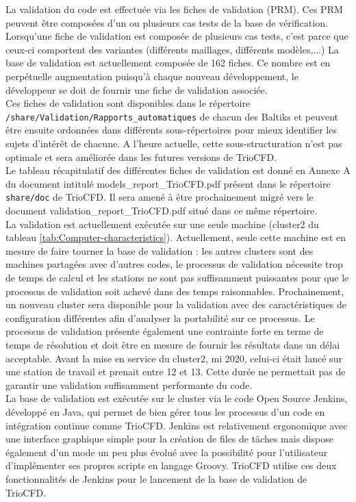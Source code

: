 La  validation du code est effectuée via les fiches de validation (PRM). Ces PRM peuvent être composées d'un ou plusieurs cas tests de la base de vérification. Lorsqu'une fiche de validation est composée de plusieurs cas tests, c'est parce que ceux-ci comportent des variantes (différents maillages, différents modèles,...) La base de validation est actuellement composée de 162 fiches. Ce nombre est en perpétuelle augmentation puisqu'à chaque nouveau développement, le développeur se doit de fournir une fiche de validation associée.\\
Ces fiches de validation sont disponibles dans le répertoire \texttt{/share/Validation/Rapports\_automatiques} de chacun des Baltiks et peuvent être ensuite ordonnées dans différents sous-répertoires pour mieux identifier les sujets d'intérêt de chacune. A l'heure actuelle, cette sous-structuration n'est pas optimale et sera améliorée dans les futures versions de TrioCFD.\\
Le tableau récapitulatif des différentes fiches de validation est donné en Annexe A du document intitulé models\_report\_TrioCFD.pdf présent dans le répertoire \texttt{share/doc} de TrioCFD. Il sera amené à être prochainement migré vers le document validation\_report\_TrioCFD.pdf situé dans ce même répertoire.\\
La validation est actuellement exécutée sur une seule machine (cluster2 du tableau \ref{tab:Computer-characteristics}). Actuellement, seule cette machine est en mesure de faire tourner la base de validation : les autres clusters sont des machines partagées avec d'autres codes, le processus de validation nécessite trop de temps de calcul et les stations ne sont pas suffisamment puissantes pour que le processus de validation soit achevé dans des temps raisonnables. Prochainement, un nouveau cluster sera disponible pour la validation avec des caractéristiques de configuration différentes afin d'analyser la portabilité sur ce processus. Le processus de validation présente également une contrainte forte en terme de temps de résolution et doit être en mesure de fournir les résultats dans un délai acceptable. Avant la mise en service du cluster2, mi 2020, celui-ci était lancé sur une station de travail et prenait entre 12 et 13. Cette durée ne permettait pas de garantir une validation suffisamment performante du code.\\
La base de validation est exécutée sur le cluster via le code Open Source Jenkins, développé en Java, qui permet de bien gérer tous les processus d'un code en intégration continue comme TrioCFD. Jenkins est relativement ergonomique avec une interface graphique simple pour la création de files de tâches mais dispose également d'un mode un peu plus évolué avec la possibilité pour l'utilisateur d'implémenter ses propres scripts en langage Groovy. TrioCFD utilise ces deux fonctionnalités de Jenkins pour le lancement de la base de validation de TrioCFD.\\
